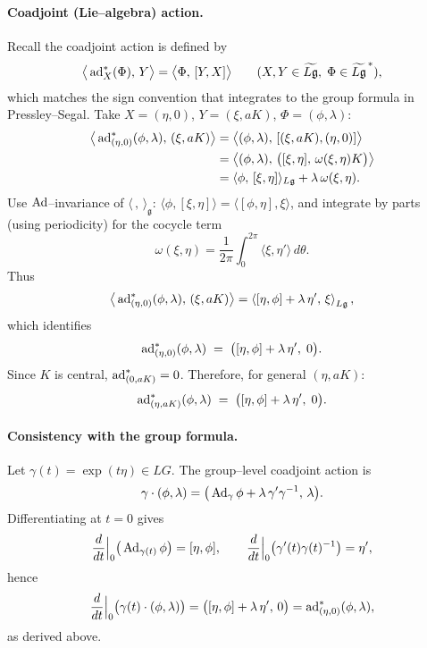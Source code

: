 \documentclass[12pt]{article}
\begin{document}
\begin{remark}
    \paragraph{Coadjoint (Lie–algebra) action.}
    Recall the coadjoint action is defined by
    \[
        \big\langle \operatorname{ad}^*_{X}(\Phi),\,Y\big\rangle
        = \big\langle \Phi,\,[Y,X]\big\rangle
        \qquad (X,Y\in \widetilde{L\mathfrak g},\;\Phi\in \widetilde{L\mathfrak g}^{\,*}),
    \]
    which matches the sign convention that integrates to the group formula in Pressley--Segal.
    Take $X=(\eta,0)$, $Y=(\xi,aK)$, $\Phi=(\phi,\lambda)$:
    \begin{align*}
        \big\langle \operatorname{ad}^*_{(\eta,0)}(\phi,\lambda),\,(\xi,aK)\big\rangle
         & = \big\langle (\phi,\lambda),\,[(\xi,aK),(\eta,0)]\big\rangle                      \\
         & = \big\langle (\phi,\lambda),\,\big([\xi,\eta],\,\omega(\xi,\eta)K\big)\big\rangle \\
         & = \langle \phi,\,[\xi,\eta]\rangle_{L\mathfrak g} + \lambda\,\omega(\xi,\eta).
    \end{align*}
    Use $\operatorname{Ad}$–invariance of $\langle\,,\,\rangle_{\mathfrak g}$:
    $\langle \phi,[\xi,\eta]\rangle=\langle [\phi,\eta],\xi\rangle$, and integrate by parts
    (using periodicity) for the cocycle term
    \[
        \omega(\xi,\eta) = \frac{1}{2\pi}\int_0^{2\pi}\!\!\langle \xi,\eta'\rangle\,d\theta.
    \]
    Thus
    \[
        \big\langle \operatorname{ad}^*_{(\eta,0)}(\phi,\lambda),\,(\xi,aK)\big\rangle
        = \left\langle [\eta,\phi]+\lambda\,\eta',\,\xi\right\rangle_{L\mathfrak g},
    \]
    which identifies
    \[
        \operatorname{ad}^*_{(\eta,0)}(\phi,\lambda)\;=\;\big([\eta,\phi]+\lambda\,\eta',\;0\big).
    \]
    Since $K$ is central, $\operatorname{ad}^*_{(0,aK)}=0$. Therefore, for general $(\eta,aK)$:
    \[
        \operatorname{ad}^*_{(\eta,aK)}(\phi,\lambda) \;=\; \big([\eta,\phi]+\lambda\,\eta',\;0\big).
    \]

    \paragraph{Consistency with the group formula.}
    Let $\gamma(t)=\exp(t\eta)\in LG$. The group–level coadjoint action is
    \[
        \gamma\cdot(\phi,\lambda)
        = \big(\operatorname{Ad}_\gamma\phi+\lambda\,\gamma'\gamma^{-1},\,\lambda\big).
    \]
    Differentiating at $t=0$ gives
    \[
        \frac{d}{dt}\Big|_{0}\big(\operatorname{Ad}_{\gamma(t)}\phi\big)=[\eta,\phi],
        \qquad
        \frac{d}{dt}\Big|_{0}\big(\gamma'(t)\gamma(t)^{-1}\big)=\eta',
    \]
    hence
    \[
        \frac{d}{dt}\Big|_{0}\big(\gamma(t)\cdot(\phi,\lambda)\big)
        = \big([\eta,\phi]+\lambda\,\eta',\,0\big)=\operatorname{ad}^*_{(\eta,0)}(\phi,\lambda),
    \]
    as derived above.
\end{remark}
\end{document}
